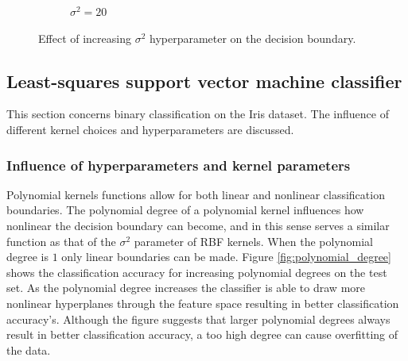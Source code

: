 \documentclass{article}
\begin{document}
\begin{figure}[h]
\begin{subfigure}[b]{0.3\textwidth}
                 \caption{$\sigma^2 = 20$}
                 \label{fig:high_sigma}
             \end{subfigure}
            \caption{Effect of increasing $\sigma^2$ hyperparameter on the decision boundary.}
        \end{figure}
        
        
    \subsection{Least-squares support vector machine classifier}
        This section concerns binary classification on the Iris dataset. The influence of different kernel choices and hyperparameters are discussed.
        
        \subsubsection{Influence of hyperparameters and kernel parameters}
           Polynomial kernels functions allow for both linear and nonlinear classification boundaries. The polynomial degree of a polynomial kernel influences how nonlinear the decision boundary can become, and in this sense serves a similar function as that of the $\sigma^2$ parameter of RBF kernels. When the polynomial degree is $1$ only linear boundaries can be made. Figure \ref{fig:polynomial_degree} shows the classification accuracy for increasing polynomial degrees on the test set. As the polynomial degree increases the classifier is able to draw more nonlinear hyperplanes through the feature space resulting in better classification accuracy's. Although the figure suggests that larger polynomial degrees always result in better classification accuracy, a too high degree can cause overfitting of the data. 
           
\end{document}

